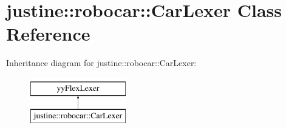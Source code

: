 \hypertarget{classjustine_1_1robocar_1_1CarLexer}{\section{justine\-:\-:robocar\-:\-:Car\-Lexer Class Reference}
\label{classjustine_1_1robocar_1_1CarLexer}
}
Inheritance diagram for justine\-:\-:robocar\-:\-:Car\-Lexer\-:\begin{figure}[H]
\begin{center}
\leavevmode
\includegraphics[height=2.000000cm]{classjustine_1_1robocar_1_1CarLexer}
\end{center}
\end{figure}
